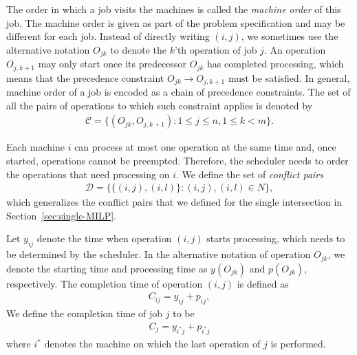 \documentclass{article}
\theoremstyle{definition}
\theoremstyle{plain}
\begin{document}
The order in which a job visits the machines is called the \textit{machine
  order} of this job. The machine order is given as part of the problem
specification and may be different for each job. Instead of directly writing
$(i,j)$, we sometimes use the alternative notation $O_{jk}$ to denote the $k$'th
operation of job $j$. An operation $O_{j,k+1}$ may only start once its
predecessor $O_{jk}$ has completed processing, which means that the precedence
constraint $O_{jk} \rightarrow O_{j,k+1}$ must be satisfied. In general, machine
order of a job is encoded as a chain of precedence constraints. The set of all
the pairs of operations to which such constraint applies is denoted by
\begin{align}
  \mathcal{C} = \{ (O_{jk}, O_{j,k+1}) : 1 \leq j \leq n, 1 \leq k < m \} .
  \label{eq:conjunctive-C}
\end{align}

Each machine $i$ can process at most one operation at the same time and, once
started, operations cannot be preempted. Therefore, the scheduler needs to order
the operations that need processing on $i$. We define the set of
\textit{conflict pairs}
\begin{align}
  \mathcal{D} = \{ \{(i,j), (i,l)\} : (i,j), (i,l) \in N \},
  \label{eq:disjunctive-D}
\end{align}
which generalizes the conflict pairs that we defined for the single intersection
in Section~\ref{sec:single-MILP}.

Let $y_{ij}$ denote the time when operation $(i,j)$ starts processing, which
needs to be determined by the scheduler. In the alternative notation of
operation $O_{jk}$, we denote the starting time and processing time as
$y(O_{jk})$ and $p(O_{jk})$, respectively. The completion time of operation
$(i,j)$ is defined as
\begin{align}
  C_{ij} = y_{ij} + p_{ij} ,
\end{align}
We define the completion time of job $j$ to be
\begin{align}
  C_{j} = y_{i^{*}j} + p_{i^{*}j}
\end{align}
where $i^{*}$ denotes the machine on which the last operation of $j$ is
performed.
\end{document}
